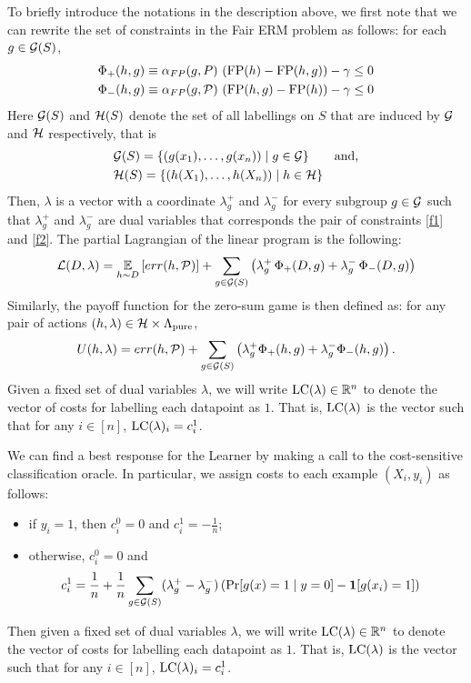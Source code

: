   To briefly introduce the notations in the description above, we
  first note that we can rewrite the set of constraints in the Fair
  ERM problem as follows: for each $g\in \mathcal{G}(S)$, 
\begin{align}
    &\Phi_+(h, g) \equiv \alpha_{FP}(g, P) \, \left(\mathrm{FP}(h) - \mathrm{FP}(h, g) \right) - \gamma\leq 0 \label{f1}\\
  &  \Phi_-(h, g)\equiv \alpha_{FP}(g, \mathcal{P})\, \left(\mathrm{FP}(h, g) - \mathrm{FP}(h)\right) - \gamma \leq 0 \label{f2}
\end{align}
Here $\mathcal{G}(S)$ and $\mathcal{H}(S)$ denote the set of all labellings on $S$
that are induced by $\mathcal{G}$ and $\mathcal{H}$ respectively, that is
\begin{align}
  &\mathcal{G}(S) = \{(g(x_1), \ldots , g(x_n)) \mid g\in \mathcal{G}\} \qquad
  \mbox{and,} \\
&\mathcal{H}(S) = \{(h(X_1), \ldots , h(X_n))\mid h\in
  \mathcal{H}\}
\end{align}
Then, $\lambda$ is a vector with a coordinate $\lambda_g^+$ and
$\lambda_g^-$ for every subgroup $g \in \mathcal{G}$ such that $\lambda_g^+$
and $\lambda_g^-$ are dual variables that corresponds the pair of
constraints \eqref{f1} and \eqref{f2}.  The partial Lagrangian of the
linear program is the following:
\begin{align*}
  \mathcal{L}(D, \lambda) = \operatorname*{\mathbb{E}}_{h\sim D}\left[err(h, \mathcal{P})\right] +  \sum_{g\in \mathcal{G}(S)}
  \left( \lambda_g^+\,  \Phi_+(D, g) +  \lambda_g^- \,  \Phi_-(D,g) \right)
\end{align*}
Similarly, the payoff function for the zero-sum game is then defined
as: for any pair of actions
$(h, \lambda)\in \mathcal{H}\times \Lambda_{\text{pure}}$,
\[
  U(h, \lambda) = err(h, \mathcal{P}) + \sum_{g\in \mathcal{G}(S)}
  \left(\lambda_g^+\Phi_+(h, g) + \lambda_g^-\Phi_-(h, g) \right).
\]
Given a fixed set of dual variables $\lambda$, we will write
$\mathrm{LC}(\lambda) \in \mathbb{R}^n$ to denote the vector of costs for labelling
each datapoint as $1$. That is, $\mathrm{LC}(\lambda)$ is the vector such that
for any $i \in [n]$, $\mathrm{LC}(\lambda)_i = c_i^1$.

We can find a best response for the Learner by making a call to the
cost-sensitive classification oracle. In particular, we assign costs
to each example $(X_i, y_i)$ as follows:
\begin{itemize}
\item if $y_i = 1$, then $c_i^0 = 0$ and $c_i^1 = - \frac{1}{n}$;
\item otherwise, $c_i^0 = 0$ and
  \begin{align}
    c_i^1 = \frac{1}{n} &+ \frac{1}{n}\sum_{g\in \mathcal{G}(S)}
                          (\lambda_g^+ - \lambda_g^-) \left(\Pr[g(x) = 1\mid y = 0] -  \mathbf{1}[g(x_i) = 1]\right)
  \end{align}
\end{itemize}
Then given a fixed set of dual variables $\lambda$, we will write
$\mathrm{LC}(\lambda) \in \mathbb{R}^n$ to denote the vector of costs for labelling
each datapoint as $1$. That is, $\mathrm{LC}(\lambda)$ is the vector such that
for any $i \in [n]$, $\mathrm{LC}(\lambda)_i = c_i^1$.
